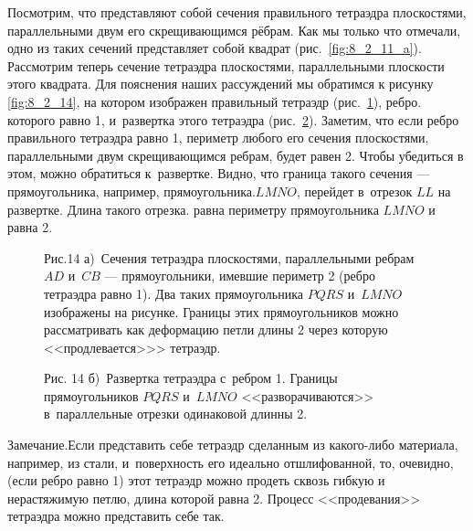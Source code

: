 Посмотрим, что представляют собой сечения правильного тетраэдра плоскостями,
параллельными двум его скрещивающимся рёбрам. Как мы только что отмечали,
одно из таких сечений представляет собой квадрат (рис.\ \ref{fig:8_2_11_a}).
Рассмотрим теперь сечение тетраэдра плоскостями, параллельными плоскости этого
квадрата. Для пояснения наших рассуждений мы обратимся к рисунку \ref{fig:8_2_14},
на котором изображен правильный тетраэдр (рис.\ \ref{fig:8_2_14_a}), ребро.
которого равно 1, и~развертка этого тетраэдра (рис.\ \ref{fig:8_2_14_b}).
Заметим, что если ребро правильного тетраэдра равно 1, периметр любого его
сечения плоскостями, параллельными двум скрещивающимся ребрам, будет равен 2.
Чтобы убедиться в этом, можно обратиться к~развертке. Видно, что граница
такого сечения --- прямоугольника, например, прямоугольника.$LMNO$, перейдет
в~отрезок $LL$ на развертке. Длина такого отрезка. равна периметру прямоугольника
$LMNO$ и равна 2.





\begin{figure}\label{fig:8_2_14_a}
\caption{Рис.14 а)~Сечения тетраэдра плоскостями, параллельными ребрам $AD$ и~$CB$
--- прямоугольники, имевшие периметр 2 (ребро тетраэдра равно 1).
Два таких прямоугольника $PQRS$ и~$LMNO$ изображены на рисунке. Границы этих
прямоугольников можно рассматривать как деформацию петли длины 2
через которую <<продлевается>>> тетраэдр.}
\end{figure}

\begin{figure}\label{fig:8_2_14_b}
\caption{Рис. 14 б)~Развертка тетраэдра с~ребром 1. Границы прямоугольников
 $PQRS$ и~$LMNO$ <<разворачиваются>> в~параллельные отрезки одинаковой длинны 2.}
\end{figure}


\begin{Note}
Замечание.Если представить себе тетраэдр сделанным из какого-либо материала,
например, из стали, и~поверхность его идеально отшлифованной, то, очевидно,
(если ребро равно 1) этот тетраэдр можно продеть сквозь гибкую и нерастяжимую
петлю, длина которой равна 2. Процесс <<продевания>> тетраэдра можно
представить себе так.
\end{Note}

